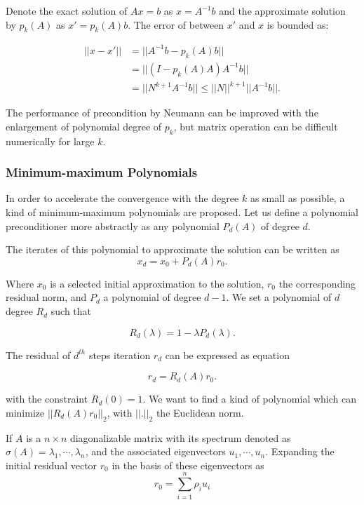 Denote the exact solution of $Ax=b$ as $x=A^{-1}b$ and the approximate solution by $p_{k}(A)$ as $x'=p_{k}(A)b$. The error of between $x'$ and $x$ is bounded as:

\begin{equation}
\begin{aligned}
||x-x'|| &= ||A^{-1}b - p_{k}(A)b|| \\ &= ||(I-p_{k}(A)A)A^{-1}b|| \\ &= ||N^{k+1}A^{-1}b|| \leq ||N||^{k+1}||A^{-1}b||.
\end{aligned}
\end{equation}

The performance of precondition by Neumann can be improved with the enlargement of polynomial degree of $p_k$, but matrix operation can be difficult numerically for large $k$.

\subsubsection{Minimum-maximum Polynomials}

In order to accelerate the convergence with the degree $k$ as small as possible, a kind of minimum-maximum polynomials are proposed. Let us define a polynomial preconditioner more abstractly as any polynomial $P_d(A)$ of degree $d$.

The iterates of this polynomial to approximate the solution can be written as 
\begin{equation}
x_d=x_0+P_d(A)r_0.
\end{equation}

Where \(x_0\) is a selected initial approximation to the solution, \(r_0\) the corresponding residual norm, and \(P_d\) a polynomial of degree \(d-1\). We set a polynomial of $d$ degree \(R_d\) such that

\begin{equation}
R_d(\lambda)=1-\lambda P_d(\lambda).
\end{equation}

The residual of \(d^{th}\) steps iteration \(r_d\) can be expressed as equation 

\begin{equation}
r_d=R_d(A)r_0.
\end{equation}

with the constraint \(R_d(0)=1\). We want to find a kind of polynomial which can minimize \(||R_d(A)r_0||_2\), with \(||.||_2\) the Euclidean norm.

If $A$ is a $n \times n$ diagonalizable matrix with its spectrum denoted as \(\sigma(A)=\lambda_1, \cdots, \lambda_n\), and the associated eigenvectors \(u_1, \cdots, u_n\). Expanding the initial residual vector $r_0$ in the basis of these eigenvectors as
\begin{equation}
\label{r0}
r_0=\sum_{i=1}^{n}\rho_i u_i
\end{equation}

